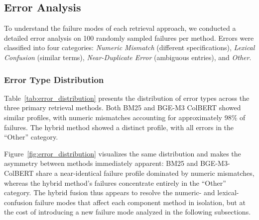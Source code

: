 \documentclass[preprint,12pt]{elsarticle}
\begin{document}
\subsection{Error Analysis}
\label{subsec:error_analysis}

To understand the failure modes of each retrieval approach, we conducted a detailed error analysis on 100 randomly sampled failures per method. Errors were classified into four categories: \textit{Numeric Mismatch} (different specifications), \textit{Lexical Confusion} (similar terms), \textit{Near-Duplicate Error} (ambiguous entries), and \textit{Other}.

\subsubsection{Error Type Distribution}

Table~\ref{tab:error_distribution} presents the distribution of error types across the three primary retrieval methods. Both BM25 and BGE-M3 ColBERT showed similar profiles, with numeric mismatches accounting for approximately 98\% of failures. The hybrid method showed a distinct profile, with all errors in the ``Other'' category.

\begin{table}[htbp]
\centering
\caption{Error type distribution across retrieval methods (\% of failed queries, $n=100$ per method)}
\label{tab:error_distribution}
\end{table}

Figure~\ref{fig:error_distribution} visualizes the same distribution and makes the asymmetry between methods immediately apparent: BM25 and BGE-M3-ColBERT share a near-identical failure profile dominated by numeric mismatches, whereas the hybrid method's failures concentrate entirely in the ``Other'' category. The hybrid fusion thus appears to resolve the numeric- and lexical-confusion failure modes that affect each component method in isolation, but at the cost of introducing a new failure mode analyzed in the following subsections.
\end{document}
